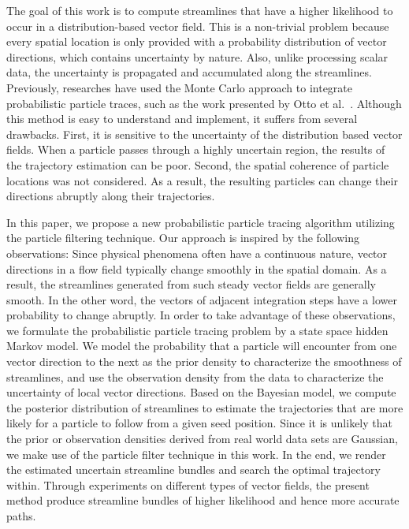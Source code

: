 \documentclass[review]{vgtc}                 %
\begin{document}
The goal of this work is to compute streamlines that have a higher likelihood to occur in a distribution-based vector field. This is a non-trivial problem because every spatial location is only provided with a probability distribution of vector directions, which contains uncertainty by nature. Also, unlike processing scalar data, the uncertainty is propagated and accumulated along the streamlines. Previously, researches have used the Monte Carlo approach to integrate probabilistic particle traces, such as the work presented by Otto et al.~\cite{Otto10a, Otto11a}. Although this method is easy to understand and implement, it suffers from several drawbacks. First, it is sensitive to the uncertainty of the distribution based vector fields. When a particle passes through a highly uncertain region, the results of the trajectory estimation can be poor. Second, the spatial coherence of particle locations was not considered. As a result, the resulting particles can change their directions abruptly along their trajectories.

In this paper, we propose a new probabilistic particle tracing algorithm utilizing the particle filtering technique. Our approach is inspired by the following observations: Since physical phenomena often have a continuous nature, vector directions in a flow field typically change smoothly in the spatial domain. As a result, the streamlines generated from such steady vector fields are generally smooth. In the other word, the vectors of adjacent integration steps have a lower probability to change abruptly. In order to take advantage of these observations, we formulate the probabilistic particle tracing problem by a state space hidden Markov model. We model the probability that a particle will encounter from one vector direction to the next as the prior density to characterize the smoothness of streamlines, and use the observation density from the data to characterize the uncertainty of local vector directions. Based on the Bayesian model, we compute the posterior distribution of streamlines to estimate the trajectories that are more likely for a particle to follow from a given seed position. Since it is unlikely that the prior or observation densities derived from real world data sets are Gaussian, we make use of the particle filter technique in this work. In the end, we render the estimated uncertain streamline bundles and search the optimal trajectory within. Through experiments on different types of vector fields, the present method produce streamline bundles of higher likelihood and hence more accurate paths.
\end{document}
